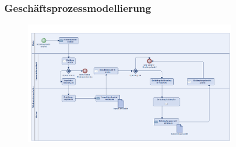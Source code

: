 \begin{frame}
\frametitle{Geschäftsprozessmodellierung}

\begin{figure}
  \includegraphics[width=0.8\textwidth]{figures/BPM.png}
  \label{fig:BPM}
\end{figure}

\end{frame}




